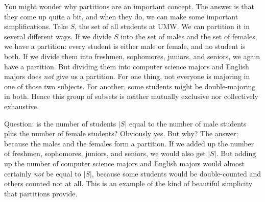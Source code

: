 You might wonder why partitions are an important concept. The answer is
that they come up quite a bit, and when they do, we can make some important
simplifications. Take $S$, the set of all students at UMW. We can partition
it in several different ways. If we divide $S$ into the set of males and
the set of females, we have a partition: every student is either male or
female, and no student is both. If we divide them into freshmen,
sophomores, juniors, and seniors, we again have a partition. But dividing
them into computer science majors and English majors does \textit{not} give
us a partition. For one thing, not everyone is majoring in one of those two
subjects. For another, some students might be double-majoring in both.
Hence this group of subsets is neither mutually exclusive nor collectively
exhaustive.

Question: is the number of students $|S|$  equal to the
number of male students plus the number of female students? Obviously yes.
But why? The answer: because the males and the females form a partition. If
we added up the number of freshmen, sophomores, juniors, and seniors, we
would also get $|S|$. But adding up the number of computer science majors
and English majors would almost certainly \textit{not} be equal to $|S|$,
because some students would be double-counted and others counted not at
all. This is an example of the kind of beautiful simplicity that partitions
provide.

